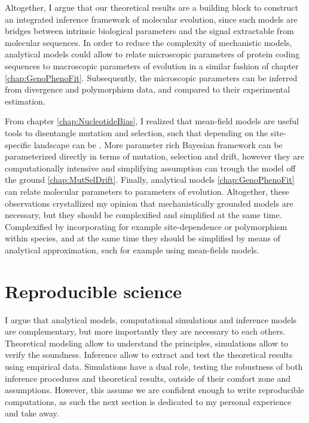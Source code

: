 Altogether, I argue that our theoretical results are a building block to construct an integrated inference framework of molecular evolution, since such models are bridges between intrinsic biological parameters and the signal extractable from molecular sequences.
In order to reduce the complexity of mechanistic models, analytical models could allow to relate microscopic parameters of protein coding sequences to macroscopic parameters of evolution in a similar fashion of chapter \ref{chap:GenoPhenoFit}.
Subsequently, the microscopic parameters can be inferred from divergence and polymorphism data, and compared to their experimental estimation.

From chapter  \ref{chap:NucleotideBias}, I realized that mean-field models are useful tools to disentangle mutation and selection, such that depending on the site-specific landscape can be .
More parameter rich Bayesian framework can be parameterized directly in terms of mutation, selection and drift, however they are computationally intensive and simplifying assumption can trough the model off the ground \ref{chap:MutSelDrift}.
Finally, analytical models \ref{chap:GenoPhenoFit} can relate molecular parameters to parameters of evolution.
Altogether, these observations crystallized my opinion that mechanistically grounded models are necessary, but they should be complexified and simplified at the same time.
Complexified by incorporating for example site-dependence or polymorphism within species, and at the same time they should be simplified by means of analytical approximation, such for example using mean-fields models. 

\section{Reproducible science}
\label{sec:reproducible-science}

I argue that analytical models, computational simulations and inference models are complementary, but more importantly they are necessary to each others.
Theoretical modeling allow to understand the principles, simulations allow to verify the soundness.
Inference allow to extract and test the theoretical results using empirical data.
Simulations have a dual role, testing the robustness of both inference procedures and theoretical results, outside of their comfort zone and assumptions.
However, this assume we are confident enough to write reproducible computations, as such the next section is dedicated to my personal experience and take away.

